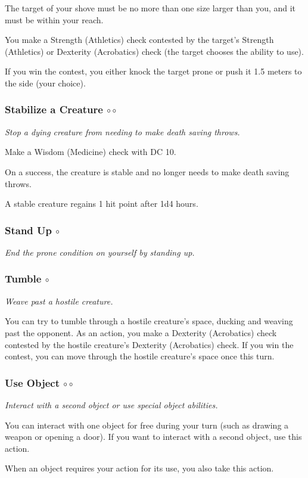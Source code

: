     The target of your shove must be no more than one size larger than you, and it must be within your reach.

    You make a Strength (Athletics) check contested by the target's Strength (Athletics) or Dexterity (Acrobatics) check (the target chooses the ability to use).

    If you win the contest, you either knock the target prone or push it 1.5 meters to the side (your choice).
\subsubsection{Stabilize a Creature $\circ\circ$} \label{act::stabilizeacreature}
    \textit{Stop a dying creature from needing to make death saving throws.}

    Make a Wisdom (Medicine) check with DC 10.

    On a success, the creature is stable and no longer needs to make death saving throws.

    A stable creature regains 1 hit point after 1d4 hours.
\subsubsection{Stand Up $\circ$} \label{act::standup}
    \textit{End the prone condition on yourself by standing up.}
\subsubsection{Tumble $\circ$} \label{act::tumble}
    \textit{Weave past a hostile creature.}

    You can try to tumble through a hostile creature's space, ducking and weaving past the opponent.
    As an action, you make a Dexterity (Acrobatics) check contested by the hostile creature's Dexterity (Acrobatics) check.
    If you win the contest, you can move through the hostile creature's space once this turn.
\subsubsection{Use Object $\circ\circ$} \label{act::useobject}
    \textit{Interact with a second object or use special object abilities.}

    You can interact with one object for free during your turn (such as drawing a weapon or opening a door).
    If you want to interact with a second object, use this action.

    When an object requires your action for its use, you also take this action.
